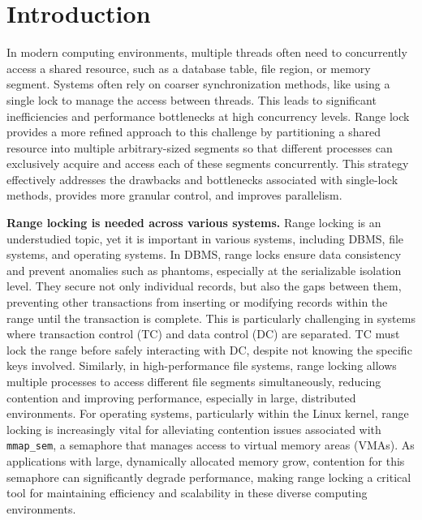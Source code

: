 \chapter{Introduction}\label{chapter:introduction}

In modern computing environments, multiple threads often need to concurrently access a shared resource, such as a database table, file region, or memory segment.
Systems often rely on coarser synchronization methods, like using a single lock to manage the access between threads. 
This leads to significant inefficiencies and performance bottlenecks at high concurrency levels. 
Range lock~\parencite{gao2023citron, kogan2020scalable, song2013parallelizing} provides a more refined approach to this challenge by partitioning a shared resource into multiple arbitrary-sized segments so that different processes can exclusively acquire and access each of these segments concurrently. 
This strategy effectively addresses the drawbacks and bottlenecks associated with single-lock methods, provides more granular control, and improves parallelism.

\textbf{Range locking is needed across various systems.}
Range locking is an understudied topic, yet it is important in various systems, including DBMS, file systems, and operating systems. 
In DBMS, range locks ensure data consistency and prevent anomalies such as phantoms, especially at the serializable isolation level. 
They secure not only individual records, but also the gaps between them, preventing other transactions from inserting or modifying records within the range until the transaction is complete. 
This is particularly challenging in systems where transaction control (TC) and data control (DC) are separated. 
TC must lock the range before safely interacting with DC, despite not knowing the specific keys involved. 
Similarly, in high-performance file systems, range locking allows multiple processes to access different file segments simultaneously, reducing contention and improving performance, especially in large, distributed environments. 
For operating systems, particularly within the Linux kernel, range locking is increasingly vital for alleviating contention issues associated with \texttt{mmap\_sem}, a semaphore that manages access to virtual memory areas (VMAs). 
As applications with large, dynamically allocated memory grow, contention for this semaphore can significantly degrade performance, making range locking a critical tool for maintaining efficiency and scalability in these diverse computing environments.

